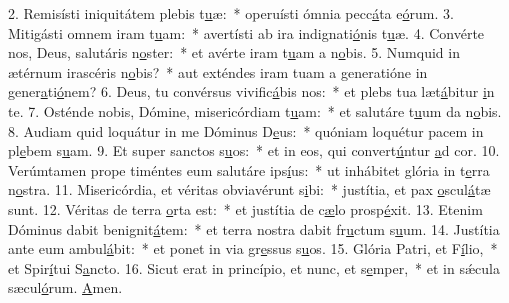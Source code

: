 2. Remisísti iniquitátem plebis t\uline{u}æ:~* operuísti ómnia pecc\uline{á}ta e\uline{ó}rum.
3. Mitigásti omnem iram t\uline{u}am:~* avertísti ab ira indignati\uline{ó}nis t\uline{u}æ.
4. Convérte nos, Deus, salutáris n\uline{o}ster:~* et avérte iram t\uline{u}am a n\uline{o}bis.
5. Numquid in ætérnum irascéris n\uline{o}bis?~* aut exténdes iram tuam a generatióne in gener\uline{a}ti\uline{ó}nem?
6. Deus, tu convérsus vivific\uline{á}bis nos:~* et plebs tua læt\uline{á}bitur \uline{i}n te.
7. Osténde nobis, Dómine, misericórdiam t\uline{u}am:~* et salutáre t\uline{u}um da n\uline{o}bis.
8. Audiam quid loquátur in me Dóminus D\uline{e}us:~* quóniam loquétur pacem in pl\uline{e}bem s\uline{u}am.
9. Et super sanctos s\uline{u}os:~* et in eos, qui convert\uline{ú}ntur \uline{a}d cor.
10. Verúmtamen prope timéntes eum salutáre ips\uline{í}us:~* ut inhábitet glória in t\uline{e}rra n\uline{o}stra.
11. Misericórdia, et véritas obviavérunt s\uline{i}bi:~* justítia, et pax \uline{o}scul\uline{á}tæ sunt.
12. Véritas de terra \uline{o}rta est:~* et justítia de c\uline{æ}lo prosp\uline{é}xit.
13. Etenim Dóminus dabit benignit\uline{á}tem:~* et terra nostra dabit fr\uline{u}ctum s\uline{u}um.
14. Justítia ante eum ambul\uline{á}bit:~* et ponet in via gr\uline{e}ssus s\uline{u}os.
15. Glória Patri, et F\uline{í}lio,~* et Spir\uline{í}tui S\uline{a}ncto.
16. Sicut erat in princípio, et nunc, et s\uline{e}mper,~* et in sǽcula sæcul\uline{ó}rum. \uline{A}men.
